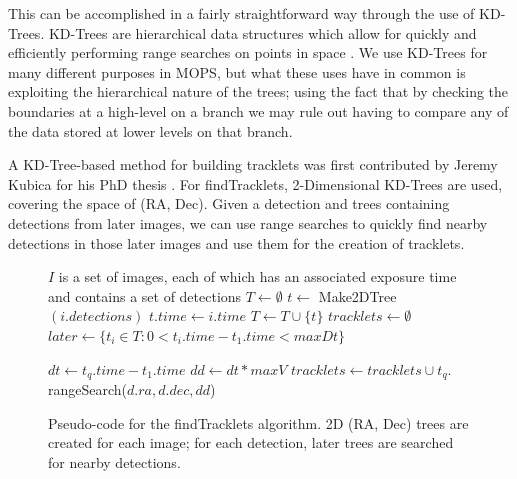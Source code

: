 This can be accomplished in a fairly straightforward way through the use of
KD-Trees.  KD-Trees are hierarchical data structures which allow for quickly and
efficiently performing range searches on points in space
\citep{bentley_kdtrees}.  We use KD-Trees for many different purposes
in MOPS, but what these uses have in common is exploiting the
hierarchical nature of the trees; using the fact that by checking the
boundaries at a high-level on a branch we may rule out having to
compare any of the data stored at lower levels on that
branch. 

A KD-Tree-based method for building
tracklets was first contributed by Jeremy Kubica for his PhD thesis
\citep{kubica_thesis}.  For findTracklets, 2-Dimensional KD-Trees are
used, covering the space of (RA, Dec).  Given a detection and trees
containing detections from later images, we can use range searches to
quickly find nearby detections in those later images and use them for
the creation of tracklets.


\begin{figure}[ht]
\hrulefill
\begin{algorithmic}[5]
\Require $I$ is a set of images, each of which has an associated exposure time and contains a set of detections
\State {}
\State $T \gets \emptyset$
  \State $t \gets$ Make2DTree$(i.detections)$
  \State $t.time \gets i.time$
  \State $T \gets T \cup \{t\}$
\EndFor
\State {}
\State $tracklets \gets \emptyset$
  \State $later \gets \{t_i \in T : 0 < t_i.time - t_1.time < maxDt\}$
 
       \State {}

        \State $dt \gets t_q.time - t_1.time$
        \State $dd \gets dt * maxV$
        \State {}
        \State $tracklets \gets tracklets \cup t_q.$rangeSearch($d.ra, d.dec, dd$)
     \EndFor
   \EndFor
\EndFor
{}
\end{algorithmic}
\hrulefill
\caption[findTracklets psuedocode.]{Pseudo-code for the findTracklets algorithm.  2D (RA, Dec)
  trees are created for each image; for each detection, later trees
  are searched for nearby detections. }
 \label{findTrackletsAlgorithm}
\end{figure}


